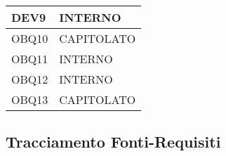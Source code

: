 \documentclass{scalatekids-article}
\begin{document}
\begin{longtable}[H]{|p{5.5cm}|p{5.5cm}|}
  \hline
  DEV9 & \multiLineCell[t]{INTERNO\\}\\
  \hline
  OBQ10 & \multiLineCell[t]{CAPITOLATO\\}\\
  \hline
  OBQ11 & \multiLineCell[t]{INTERNO\\}\\
  \hline
  OBQ12 & \multiLineCell[t]{INTERNO\\}\\
  \hline
  OBQ13 & \multiLineCell[t]{CAPITOLATO\\}\\
  \hline
\end{longtable}
\newpage

\subsection{Tracciamento Fonti-Requisiti}
\end{document}
